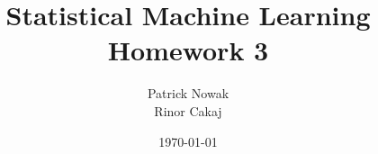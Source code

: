 \documentclass[
	colorback=false,
	solution=true,
	]{tudaexercise}
\def\homework{3}
\begin{document}
\title{Statistical Machine Learning Homework 3}
\author{Patrick Nowak\\Rinor Cakaj}
\date{\today}
\sheetnumber{\homework}
\setcounter{section}{\homework}

\maketitle

\newpage



%
\end{document}
